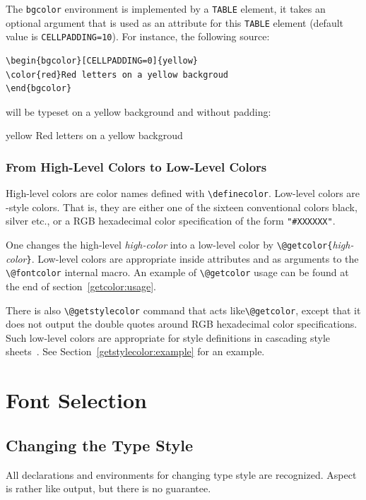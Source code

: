 The \texttt{bgcolor} environment is implemented by a \verb+TABLE+
element, it takes an
optional argument that is used as an attribute for this \verb+TABLE+
element (default value is \verb+CELLPADDING=10+).
For instance, the following source:
\begin{verbatim}
\begin{bgcolor}[CELLPADDING=0]{yellow}
\color{red}Red letters on a yellow backgroud
\end{bgcolor}
\end{verbatim}
will be typeset on a yellow background and without padding:
\begin{htmlonly}
\begin{bgcolor}[CELLPADDING=0]{yellow}
\color{red}Red letters on a yellow backgroud
\end{bgcolor}
\end{htmlonly}


\subsubsection{From High-Level Colors to Low-Level Colors}\label{getcolor}
High-level colors are color names
defined with \verb+\definecolor+.
Low-level colors are \html-style colors.
That is, they are either one of the sixteen conventional colors black,
silver etc., or a RGB hexadecimal color specification of the form
\verb+"#XXXXXX"+.


One changes the high-level \emph{high-color} into a low-level color by
\verb+\@getcolor{+\emph{high-color}\verb+}+.
Low-level colors are appropriate inside \html{} attributes and as
arguments to the \verb+\@fontcolor+ internal macro.
An example of \verb+\@getcolor+ usage can be found at the end of
section~\ref{getcolor:usage}.

There is also \verb+\@getstylecolor+ command that acts
like\verb+\@getcolor+, except that it does not output the double
quotes around RGB hexadecimal color specifications.
Such low-level colors are appropriate for style definitions in
cascading style sheets~\cite{css}. See
Section~\ref{getstylecolor:example} for an example.


\section{Font Selection}

\subsection{Changing the Type Style}\label{type-style}
All \LaTeXe{} declarations and environments for changing type style
are recognized. Aspect is rather like \LaTeXe{} output, but there is
no guarantee.

